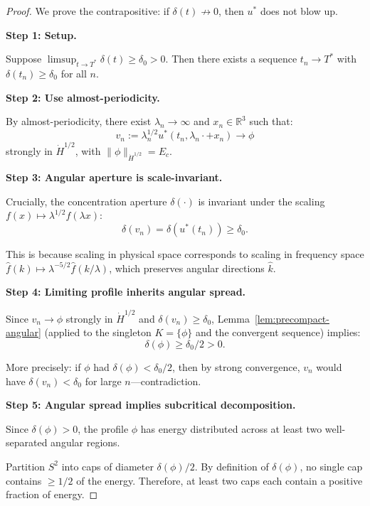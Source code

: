 \documentclass[11pt]{article}
\theoremstyle{definition}
\newcommand{\R}{\mathbb{R}}
\begin{document}
\begin{proof}
We prove the contrapositive: if $\delta(t) \not\to 0$, then $u^*$ does not blow up.

\textbf{Step 1: Setup.}

Suppose $\limsup_{t \to T^*} \delta(t) \geq \delta_0 > 0$. Then there exists a sequence $t_n \to T^*$ with $\delta(t_n) \geq \delta_0$ for all $n$.

\textbf{Step 2: Use almost-periodicity.}

By almost-periodicity, there exist $\lambda_n \to \infty$ and $x_n \in \R^3$ such that:
\begin{equation}
v_n := \lambda_n^{1/2} u^*(t_n, \lambda_n \cdot + x_n) \to \phi
\end{equation}
strongly in $\dot{H}^{1/2}$, with $\|\phi\|_{\dot{H}^{1/2}} = E_c$.

\textbf{Step 3: Angular aperture is scale-invariant.}

Crucially, the concentration aperture $\delta(\cdot)$ is invariant under the scaling $f(x) \mapsto \lambda^{1/2} f(\lambda x)$:
\begin{equation}
\delta(v_n) = \delta(u^*(t_n)) \geq \delta_0.
\end{equation}

This is because scaling in physical space corresponds to scaling in frequency space $\hat{f}(k) \mapsto \lambda^{-5/2} \hat{f}(k/\lambda)$, which preserves angular directions $\hat{k}$.

\textbf{Step 4: Limiting profile inherits angular spread.}

Since $v_n \to \phi$ strongly in $\dot{H}^{1/2}$ and $\delta(v_n) \geq \delta_0$, Lemma~\ref{lem:precompact-angular} (applied to the singleton $K = \{\phi\}$ and the convergent sequence) implies:
\begin{equation}
\delta(\phi) \geq \delta_0/2 > 0.
\end{equation}

More precisely: if $\phi$ had $\delta(\phi) < \delta_0/2$, then by strong convergence, $v_n$ would have $\delta(v_n) < \delta_0$ for large $n$---contradiction.

\textbf{Step 5: Angular spread implies subcritical decomposition.}

Since $\delta(\phi) > 0$, the profile $\phi$ has energy distributed across at least two well-separated angular regions.

Partition $S^2$ into caps of diameter $\delta(\phi)/2$. By definition of $\delta(\phi)$, no single cap contains $\geq 1/2$ of the energy. Therefore, at least two caps each contain a positive fraction of energy.


\end{proof}
\end{document}
